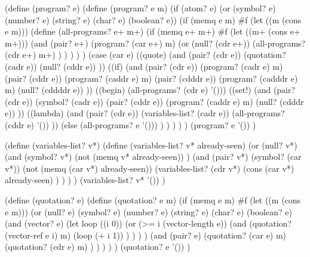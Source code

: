 \begin{code:lisp}
(define (program? e)
  (define (program? e m)
    (if (atom? e)
        (or (symbol? e) (number? e) (string? e) (char? e) (boolean? e))
        (if (memq e m) #f
            (let ((m (cons e m)))
              (define (all-programs? e+ m+)
                (if (memq e+ m+) #f
                    (let ((m+ (cons e+ m+)))
                      (and (pair? e+)
                           (program? (car e+) m)
                           (or (null? (cdr e+))
                               (all-programs? (cdr e+) m+) ) ) ) ) )
              (case (car e)
                ((quote) (and (pair? (cdr e))
                              (quotation? (cadr e))
                              (null? (cddr e)) ))
                ((if) (and (pair? (cdr e))
                           (program? (cadr e) m)
                           (pair? (cddr e))
                           (program? (caddr e) m)
                           (pair? (cdddr e))
                           (program? (cadddr e) m)
                           (null? (cddddr e)) ))
                ((begin) (all-programs? (cdr e) '()))
                ((set!) (and (pair? (cdr e))
                             (symbol? (cadr e))
                             (pair? (cddr e))
                             (program? (caddr e) m)
                             (null? (cdddr e)) ))
                ((lambda) (and (pair? (cdr e))
                               (variables-list? (cadr e))
                               (all-programs? (cddr e) '()) ))
                (else (all-programs? e '())) ) ) ) ) )
  (program? e '()) )

(define (variables-list? v*)
  (define (variables-list? v* already-seen)
    (or (null? v*)
        (and (symbol? v*)
             (not (memq v* already-seen)) )
        (and (pair? v*)
             (symbol? (car v*))
             (not (memq (car v*) already-seen))
             (variables-list? (cdr v*)
                              (cons (car v*) already-seen) ) ) ) )
  (variables-list? v* '()) )

(define (quotation? e)
  (define (quotation? e m)
    (if (memq e m) #f
        (let ((m (cons e m)))
          (or (null? e) (symbol? e) (number? e)
              (string? e) (char? e) (boolean? e)
              (and (vector? e)
                   (let loop ((i 0))
                     (or (>= i (vector-length e))
                         (and (quotation? (vector-ref e i) m)
                              (loop (+ i 1)) ) ) ) )
              (and (pair? e)
                   (quotation? (car e) m)
                   (quotation? (cdr e) m) ) ) ) ) )
  (quotation? e '()) )
\end{code:lisp}

